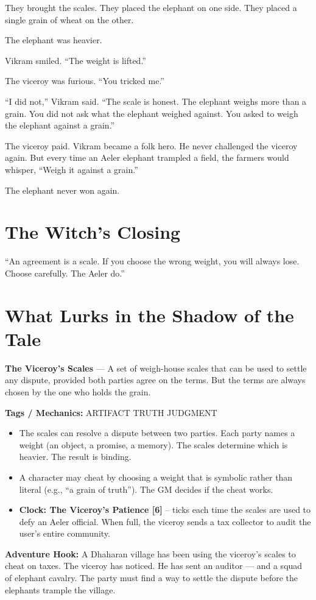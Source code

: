 \documentclass[10pt,twoside]{book}
\newcommand{\tag}[1]{\textsc{#1}}
\begin{document}
They brought the scales. They placed the elephant on one side. They placed a single grain of wheat on the other.

The elephant was heavier.

Vikram smiled. ``The weight is lifted.''

The viceroy was furious. ``You tricked me.''

``I did not,'' Vikram said. ``The scale is honest. The elephant weighs more than a grain. You did not ask what the elephant weighed against. You asked to weigh the elephant against a grain.''

The viceroy paid. Vikram became a folk hero. He never challenged the viceroy again. But every time an Aeler elephant trampled a field, the farmers would whisper, ``Weigh it against a grain.''

The elephant never won again.

\section*{The Witch's Closing}
``An agreement is a scale. If you choose the wrong weight, you will always lose. Choose carefully. The Aeler do.''

\section*{What Lurks in the Shadow of the Tale}
\begin{infobox}
\textbf{The Viceroy's Scales} --- A set of weigh-house scales that can be used to settle any dispute, provided both parties agree on the terms. But the terms are always chosen by the one who holds the grain.

\textbf{Tags / Mechanics:} \tag{ARTIFACT} \tag{TRUTH} \tag{JUDGMENT}

\begin{itemize}
\item The scales can resolve a dispute between two parties. Each party names a weight (an object, a promise, a memory). The scales determine which is heavier. The result is binding.
\item A character may cheat by choosing a weight that is symbolic rather than literal (e.g., ``a grain of truth''). The GM decides if the cheat works.
\item \textbf{Clock: The Viceroy's Patience [6]} -- ticks each time the scales are used to defy an Aeler official. When full, the viceroy sends a tax collector to audit the user's entire community.
\end{itemize}

\textbf{Adventure Hook:} A Dhaharan village has been using the viceroy's scales to cheat on taxes. The viceroy has noticed. He has sent an auditor --- and a squad of elephant cavalry. The party must find a way to settle the dispute before the elephants trample the village.
\end{infobox}
\end{document}
